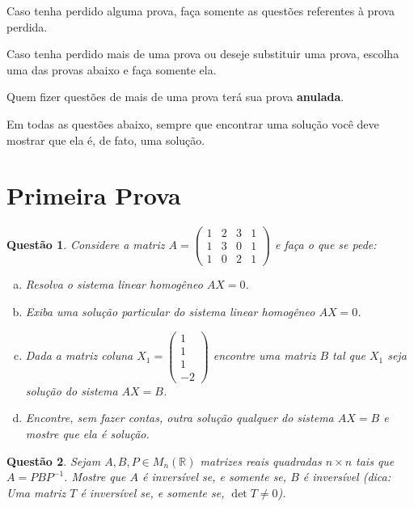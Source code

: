 \documentclass[a4paper,12pt]{article}
\author{Prova Suplementar - GAAL}
\date{02 de Julho de 2019}
\title{}
\def\R{\mathbb R}
\newtheorem{qst}{Questão}
\begin{document}
\maketitle

Caso tenha perdido alguma prova, faça somente as questões referentes à prova perdida.

Caso tenha perdido mais de uma prova ou deseje substituir uma prova, escolha uma das provas abaixo e faça somente ela.

Quem fizer questões de mais de uma prova terá sua prova \textbf{anulada}.

Em todas as questões abaixo, sempre que encontrar uma solução você deve mostrar que ela é, de fato, uma solução.

\section*{Primeira Prova}

\begin{qst}
	Considere a matriz $A=\begin{pmatrix}
	1&2&3&1\\1&3&0&1\\1&0&2&1
	\end{pmatrix}$ e faça o que se pede:
	\begin{enumerate}[a)]
		\item Resolva o sistema linear homogêneo $AX=0$.
		\item Exiba uma solução particular do sistema linear homogêneo $AX=0$.
		\item Dada a matriz coluna $X_1=\begin{pmatrix}
		1\\1\\1\\-2
		\end{pmatrix}$ encontre uma matriz $B$ tal que $X_1$ seja solução do sistema $AX=B$.
		\item Encontre, sem fazer contas, outra solução qualquer do sistema $AX=B$ e mostre que ela é solução.
	\end{enumerate}
\end{qst}

\begin{qst}
	Sejam $A,B,P\in M_n(\R)$ matrizes reais quadradas $n\times n$ tais que $A=PBP^{-1}$. Mostre que $A$ é inversível se, e somente se, $B$ é inversível (dica: Uma matriz $T$ é inversível se, e somente se, $\det T\neq 0$).
\end{qst}
\pagebreak
\end{document}
